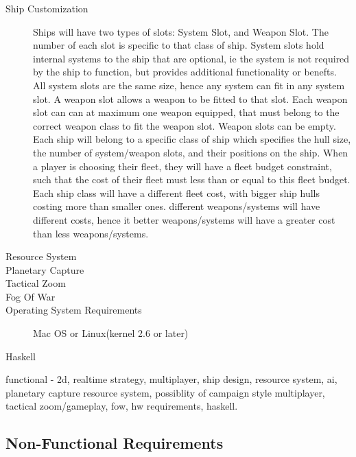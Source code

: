 \begin{description}
\item[Ship Customization]
Ships will have two types of slots: System Slot, and Weapon Slot.
The number of each slot is specific to that class of ship.
System slots hold internal systems to the ship that are optional, ie the system is not required by the ship to function, but provides additional functionality or benefts.
All system slots are the same size, hence any system can fit in any system slot.
A weapon slot allows a weapon to be fitted to that slot.
Each weapon slot can can at maximum one weapon equipped, that must belong to the correct weapon class to fit the weapon slot.
Weapon slots can be empty.
Each ship will belong to a specific class of ship which specifies the hull size, the number of system/weapon slots, and their positions on the ship.
When a player is choosing their fleet, they will have a fleet budget constraint, such that the cost of their fleet must less than or equal to this fleet budget.
Each ship class will have a different fleet cost, with bigger ship hulls costing more than smaller ones.
different weapons/systems will have different costs, hence it better weapons/systems will have a greater cost than less weapons/systems.



\item[Resource System]

\item[Planetary Capture]

\item[Tactical Zoom]

\item[Fog Of War]

\item[Operating System Requirements]
Mac OS or Linux(kernel 2.6 or later) 

\item[Haskell]

\end{description}

functional - 2d, realtime strategy, multiplayer, ship design, resource system, ai, planetary capture resource system, possiblity of campaign style multiplayer, tactical zoom/gameplay, fow, hw requirements, haskell.


\subsection{Non-Functional Requirements}

